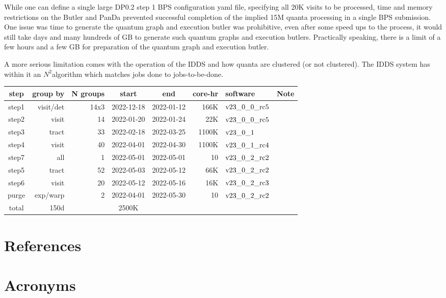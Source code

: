 \documentclass[OPS,authoryear,toc]{lsstdoc}
\begin{document}
While one can define a single large DP0.2 step 1 BPS configuration yaml file,
specifying all 20K visits to be processed, time and memory restrictions
on the Butler and PanDa prevented successful completion of the implied 
15M quanta processing in a single BPS submission.
One issue was time to generate the quantum graph and execution butler was
prohibitive, even after some speed ups to the process, it would still take
days and many hundreds of GB to generate such quantum graphs and execution
butlers.  Practically speaking, there is a limit of a few hours and a few GB
for preparation of the quantum graph and execution butler.  

A more serious limitation comes with the operation of the IDDS and how
quanta are clustered (or not clustered).  The IDDS system has within it an $N^2$algorithm which matches jobs done to jobs-to-be-done.


\begin{center}
\begin{tabular} { |c|r|r|c|c|r|l|l|}
\hline
step & group by & N groups & start & end & core-hr & software & Note\\
\hline
step1 & visit/det & 14x3 &2022-12-18& 2022-01-12 & 166K & $\rm v23\_0\_0\_rc5$ &\\
step2 & visit  & 14 & 2022-01-20& 2022-01-24 & 22K & $\rm v23\_0\_0\_rc5$ &\\
step3 & tract & 33 & 2022-02-18& 2022-03-25 & 1100K & $\rm v23\_0\_1$ &\\
step4 & visit & 40& 2022-04-01& 2022-04-30 & 1100K & $\rm v23\_0\_1\_rc4$ &\\
step7 & all & 1 & 2022-05-01& 2022-05-01 & 10 & $\rm v23\_0\_2\_rc2$ &\\
step5 & tract & 52 & 2022-05-03& 2022-05-12 & 66K & $\rm v23\_0\_2\_rc2$ &\\
step6 & visit & 20&2022-05-12& 2022-05-16 & 16K & $\rm v23\_0\_2\_rc3$ &\\
purge & exp/warp & 2 & 2022-04-01& 2022-05-30 & 10 & $\rm v23\_0\_2\_rc2$ & \\
\hline
total & 150d & & 2500K & &\\
\hline
\end{tabular}
\end{center}




\appendix
\section{References} \label{sec:bib}
\renewcommand{\refname}{} %


\section{Acronyms} \label{sec:acronyms}

\end{document}
